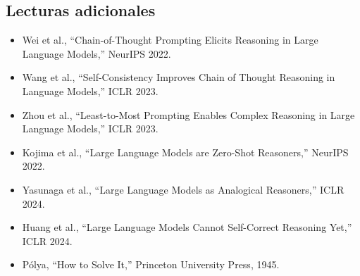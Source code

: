 \documentclass[a4paper]{article}
\begin{document}
\subsection{Lecturas adicionales}

\begin{itemize}
    \item Wei et al., ``Chain-of-Thought Prompting Elicits Reasoning in Large Language Models,'' NeurIPS 2022.
    \item Wang et al., ``Self-Consistency Improves Chain of Thought Reasoning in Language Models,'' ICLR 2023.
    \item Zhou et al., ``Least-to-Most Prompting Enables Complex Reasoning in Large Language Models,'' ICLR 2023.
    \item Kojima et al., ``Large Language Models are Zero-Shot Reasoners,'' NeurIPS 2022.
    \item Yasunaga et al., ``Large Language Models as Analogical Reasoners,'' ICLR 2024.
    \item Huang et al., ``Large Language Models Cannot Self-Correct Reasoning Yet,'' ICLR 2024.
    \item P\'{o}lya, ``How to Solve It,'' Princeton University Press, 1945.
\end{itemize}

\end{document}
